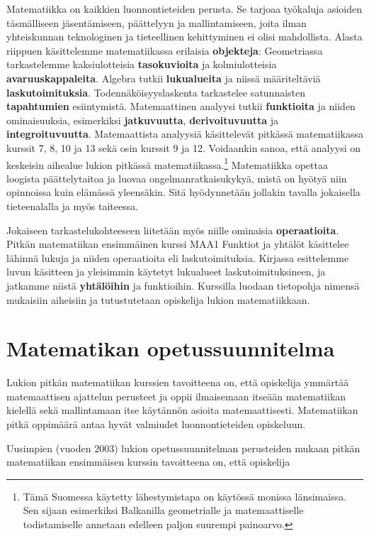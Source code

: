 Matematiikka on kaikkien luonnontieteiden perusta. Se tarjoaa työkaluja asioiden täsmälliseen jäsentämiseen, päättelyyn ja mallintamiseen, joita ilman yhteiskunnan teknologinen ja tieteellinen kehittyminen ei olisi mahdollista. Alasta riippuen käsittelemme matematiikassa erilaisia \textbf{objekteja}: Geometriassa tarkastelemme kaksiulotteisia \textbf{tasokuvioita} ja kolmiulotteisia \textbf{avaruuskappaleita}. Algebra tutkii \textbf{lukualueita} ja niissä määriteltäviä \textbf{laskutoimituksia}. Todennäköisyyslaskenta tarkastelee satunnaisten \textbf{tapahtumien} esiintymistä. Matemaattinen analyysi tutkii \textbf{funktioita} ja niiden ominaisuuksia, esimerkiksi \textbf{jatkuvuutta}, \textbf{derivoituvuutta} ja \textbf{integroituvuutta}. Matemaattista analyysiä käsittelevät pitkässä matematiikassa kurssit 7, 8, 10 ja 13 sekä osin kurssit 9 ja 12. Voidaankin sanoa, että analyysi on keskeisin aihealue lukion pitkässä matematiikassa.\footnote[1]{Tämä Suomessa käytetty lähestymistapa on käytössä monissa länsimaissa. Sen sijaan esimerkiksi Balkanilla geometrialle ja matemaattiselle todistamiselle annetaan edelleen paljon suurempi painoarvo.} Matematiikka opettaa loogista päättelytaitoa ja luovaa ongelmanratkaisukykyä, mistä on hyötyä niin opinnoissa kuin elämässä yleensäkin. Sitä hyödynnetään jollakin tavalla jokaisella tieteenalalla ja myös taiteessa. 

Jokaiseen tarkastelukohteeseen liitetään myös niille ominaisia \textbf{operaatioita}. Pitkän matematiikan ensimmäinen kurssi MAA1 Funktiot ja yhtälöt käsittelee lähinnä lukuja ja niiden operaatioita eli laskutoimituksia. Kirjassa esittelemme luvun käsitteen ja yleisimmin käytetyt lukualueet laskutoimituksineen, ja jatkamme niistä \textbf{yhtälöihin} ja funktioihin. Kurssilla luodaan tietopohja nimensä mukaisiin aiheisiin ja tutustutetaan opiskelija lukion matematiikkaan.

\newpage
\section*{Matematikan opetussuunnitelma}

Lukion pitkän matematiikan kurssien tavoitteena on, että opiskelija ymmärtää matemaattisen ajattelun perusteet ja oppii ilmaisemaan itseään matematiikan kielellä sekä mallintamaan itse käytännön asioita matemaattisesti. Matematiikan pitkä oppimäärä antaa hyvät valmiudet luonnontieteiden opiskeluun.

Uusimpien (vuoden 2003) lukion opetussuunnitelman perusteiden mukaan pitkän matematiikan ensimmäisen kurssin tavoitteena on, että opiskelija

